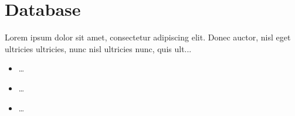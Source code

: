 \chapter{Database}

Lorem ipsum dolor sit amet, consectetur adipiscing elit. Donec auctor, nisl eget ultricies ultricies, nunc nisl ultricies nunc, quis ult...


\begin{itemize}
    \item \dots
    \item \dots
    \item \dots
\end{itemize}